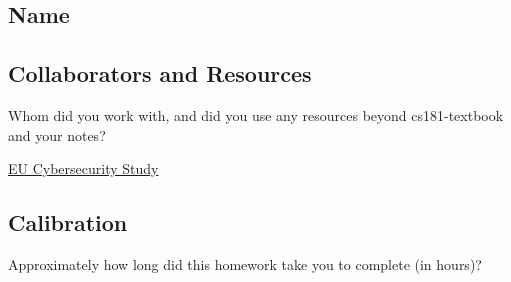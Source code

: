\documentclass[submit]{harvardml}
\begin{document}
\subsection*{Name}

\subsection*{Collaborators and Resources}
Whom did you work with, and did you use any resources beyond cs181-textbook and your notes?

\href{https://www.lifewire.com/how-self-driving-cars-can-be-hacked-5114337}{EU Cybersecurity Study}

\subsection*{Calibration}
Approximately how long did this homework take you to complete (in hours)? 
\end{document}
